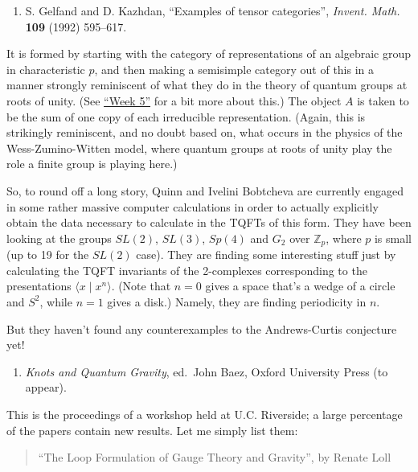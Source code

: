\documentclass{article}
\def\tightlist{}
\begin{document}
\begin{enumerate}
\def\labelenumi{\arabic{enumi})}
\setcounter{enumi}{4}
\tightlist
\item
  S. Gelfand and D. Kazhdan, ``Examples of tensor categories'',
  \emph{Invent. Math.} \textbf{109} (1992) 595--617.
\end{enumerate}

It is formed by starting with the category of representations of an
algebraic group in characteristic \(p\), and then making a semisimple
category out of this in a manner strongly reminiscent of what they do in
the theory of quantum groups at roots of unity. (See
\protect\hyperlink{week5}{``Week 5''} for a bit more about this.) The
object \(A\) is taken to be the sum of one copy of each irreducible
representation. (Again, this is strikingly reminiscent, and no doubt
based on, what occurs in the physics of the Wess-Zumino-Witten model,
where quantum groups at roots of unity play the role a finite group is
playing here.)

So, to round off a long story, Quinn and Ivelini Bobtcheva are currently
engaged in some rather massive computer calculations in order to
actually explicitly obtain the data necessary to calculate in the TQFTs
of this form. They have been looking at the groups \(SL(2)\), \(SL(3)\),
\(Sp(4)\) and \(G_2\) over \(\mathbb{Z}_p\), where \(p\) is small (up to
19 for the \(SL(2)\) case). They are finding some interesting stuff just
by calculating the TQFT invariants of the 2-complexes corresponding to
the presentations \(\langle x \mid x^n \rangle\). (Note that \(n = 0\)
gives a space that's a wedge of a circle and \(S^2\), while \(n = 1\)
gives a disk.) Namely, they are finding periodicity in \(n\).

But they haven't found any counterexamples to the Andrews-Curtis
conjecture yet!

\begin{enumerate}
\def\labelenumi{\arabic{enumi})}
\setcounter{enumi}{5}
\tightlist
\item
  \emph{Knots and Quantum Gravity}, ed.~John Baez, Oxford University
  Press (to appear).
\end{enumerate}

This is the proceedings of a workshop held at U.C. Riverside; a large
percentage of the papers contain new results. Let me simply list them:

\begin{quote}
``The Loop Formulation of Gauge Theory and Gravity'', by Renate Loll
\end{quote}
\end{document}
